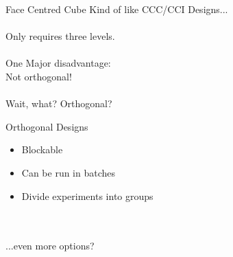 \documentclass[14pt]{beamer}
\begin{document}
\begin{frame}{Face Centred Cube}
Kind of like CCC/CCI Designs...\\
\ \\
\pause
Only requires three levels.\\
\ \\
\pause
One Major disadvantage: \\
\pause
Not orthogonal! \\
\ \\
\vspace{3cm}
\pause
Wait, what? Orthogonal?
\end{frame}


\begin{frame}{Orthogonal Designs}
\pause
\begin{itemize}
\item Blockable
\pause
\item Can be run in batches
\pause
\item Divide experiments into groups
\end{itemize}
\pause
\ \\
\ \\
...even more options?
\end{frame}
\end{document}
